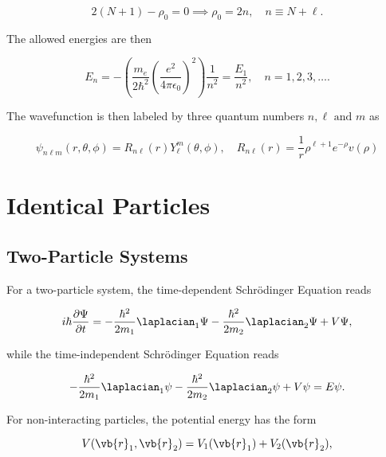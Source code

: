 \documentclass[a4paper,12pt]{report}
\begin{document}
\begin{equation}
  2(N+1) - \rho _{0} = 0 \implies \rho _{0} = 2n, \quad n \equiv N+\ell.
\end{equation}

The allowed energies are then 

\begin{equation}
  E_{n} = -\left( \frac{m_{e} }{2\hbar ^2} \left( \frac{e^2}{4\pi \epsilon_0 }  \right)^2  \right) \frac{1}{n^2} = \frac{E_1 }{n^2}, \quad n = 1,2,3, \ldots .  
\end{equation}

The wavefunction is then labeled by three quantum numbers \(n, \ell \text { and } m\) as 

\begin{equation}
  \psi _{n \ell m}(r,\theta ,\phi ) = R_{n \ell }(r)Y_{\ell }^{m} (\theta ,\phi ), \quad R_{n \ell }(r) = \frac{1}{r}\rho ^{\ell +1} e^{-\rho } v(\rho )        
\end{equation}


\chapter{Identical Particles}

\section{Two-Particle Systems}

For a two-particle system, the time-dependent Schrödinger Equation reads

\begin{equation}
  i \hbar \frac{\partial \Psi }{\partial t} = -\frac{\hbar ^2}{2m_1 } \laplacian _{1}\Psi - \frac{\hbar ^2}{2m_2 } \laplacian _{2} \Psi + V \Psi,
\end{equation}

while the time-independent Schrödinger Equation reads

\begin{equation}
  -\frac{\hbar ^2}{2m_1 }\laplacian _{1}\psi - \frac{\hbar ^2}{2m_2 }\laplacian _{2}\psi  + V\psi = E\psi .   
\end{equation}

For non-interacting particles, the potential energy has the form

\begin{equation}
  V(\vb{r} _{1},\vb{r} _{2}  ) = V_1 (\vb{r} _{1} ) + V_2 (\vb{r} _{2} ),
\end{equation}
\end{document}
